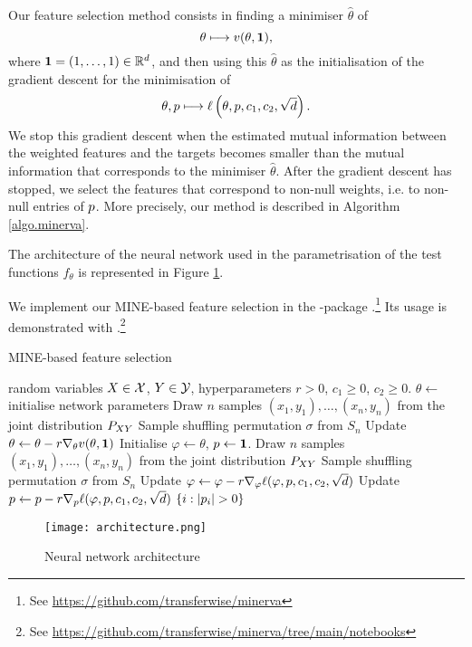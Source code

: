 Our feature selection method
consists in
finding a minimiser 
$\hat{\theta}$ of 
\begin{equation*}
\theta \longmapsto {v}(\theta, \mathbf{1}),
\end{equation*}
where $\mathbf{1} = (1, \dots, 1) \in \mathbb{R}^{d}$,
and then using this $\hat{\theta}$
as the initialisation of the gradient descent 
for the minimisation of 
\begin{equation*}
	\theta, {p} \longmapsto {\ell}\left(\theta, {p}, c_1, c_2, \sqrt{d}\right).
\end{equation*}
We stop this gradient descent 
when 
the estimated mutual information 
between 
the weighted features
and
the targets
becomes smaller than 
the mutual information 
that corresponds to the minimiser 
$\hat{\theta}$.
After the gradient descent has stopped,
we select the features that correspond to non-null weights,
i.e. to non-null entries of ${p}$.
More precisely, our method is described in Algorithm \ref{algo.minerva}.

The architecture 
of 
the neural network 
used in 
the parametrisation  of the test functions 
$f_\theta$
is represented in 
Figure
\ref{fig.networkarchitecture}.

We implement our MINE-based feature selection in the 
-package 
.\footnote{
	See
	\url{https://github.com/transferwise/minerva}
}
Its usage is demonstrated 
with 
.\footnote{
	See \url{https://github.com/transferwise/minerva/tree/main/notebooks}
}

\begin{algorithm}
	\caption{MINE-based feature selection}
	\label{algo.minerva}
	\begin{algorithmic}[1]
		\REQUIRE
		random variables
		$X\in \mathcal{X}$,
		$Y\in \mathcal{Y}$,
		hyperparameters
		$r>0$, $c_1\geq 0$, $c_2\geq 0$.
		\STATE $\theta \leftarrow$ initialise network parameters
		\REPEAT
		\STATE Draw $n$ samples $(x_1, y_1), \dots, (x_n, y_n)$ from the joint distribution ${{P}}_{XY}$
		\STATE Sample shuffling permutation $\sigma$ from $S_n$
		\STATE Update $\theta \leftarrow \theta - r\nabla_{\theta}{v}(\theta, \mathbf{1})$%
		\STATE Initialise $\varphi \leftarrow \theta$, ${p} \leftarrow \mathbf{1}$.
		\REPEAT
		\STATE Draw $n$ samples $(x_1, y_1), \dots, (x_n, y_n)$ from the joint distribution ${{P}}_{XY}$
		\STATE Sample shuffling permutation $\sigma$ from $S_n$
		\STATE Update $\varphi \leftarrow \varphi - r \nabla_{\varphi}{\ell}(\varphi, {p}, c_1, c_2, \sqrt{d})$
		\STATE Update ${p} \leftarrow {p} - r \nabla_{{p}}{\ell}(\varphi, {p}, c_1, c_2, \sqrt{d})$
		\RETURN $\left\lbrace i: \left\lvert {{p}_i} \right\rvert > 0\right\rbrace$
	\end{algorithmic}
\end{algorithm}

\begin{figure}
	\caption{Neural network architecture}
	\label{fig.networkarchitecture}
	\texttt{[image: architecture.png]}
\end{figure}





